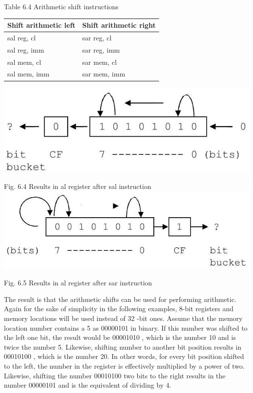 \documentclass[10pt]{article}
\begin{document}
Table 6.4 Arithmetic shift instructions

\begin{center}
\begin{tabular}{|ll|}
\hline
Shift arithmetic left & Shift arithmetic right \\
\hline
sal reg, cl & sar reg, cl \\
sal reg, imm & sar reg, imm \\
sal mem, cl & sar mem, cl \\
sal mem, imm & sar mem, imm \\
\hline
\end{tabular}
\end{center}

\begin{center}
\includegraphics[max width=\textwidth]{2025_03_24_ebe50cc223a6fbc49eecg-120(1)}
\end{center}

Fig. 6.4 Results in al register after sal instruction\\
\includegraphics[max width=\textwidth, center]{2025_03_24_ebe50cc223a6fbc49eecg-120}

Fig. 6.5 Results in al register after sar instruction

The result is that the arithmetic shifts can be used for performing arithmetic. Again for the sake of simplicity in the following examples, 8-bit registers and memory locations will be used instead of 32 -bit ones. Assume that the memory location number contains a 5 as 00000101 in binary. If this number was shifted to the left one bit, the result would be 00001010 , which is the number 10 and is twice the number 5. Likewise, shifting number to another bit position results in 00010100 , which is the number 20. In other words, for every bit position shifted to the left, the number in the register is effectively multiplied by a power of two. Likewise, shifting the number 00010100 two bits to the right results in the number 00000101 and is the equivalent of dividing by 4.
\end{document}
